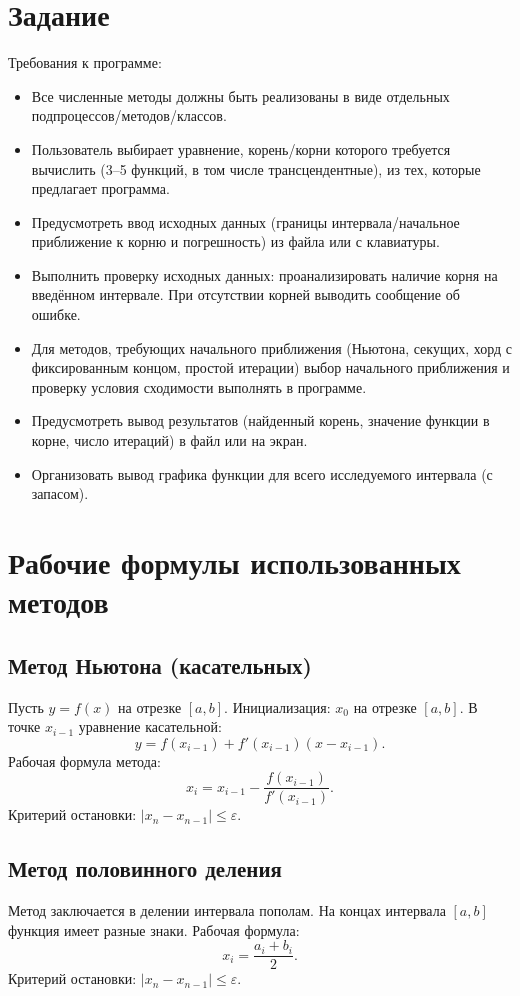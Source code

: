\documentclass[a4paper,12pt]{article}
\begin{document}
\section{Задание}
Требования к программе:
\begin{itemize}Цель
  \item Все численные методы должны быть реализованы в виде отдельных подпроцессов/методов/классов.
  \item Пользователь выбирает уравнение, корень/корни которого требуется вычислить (3–5 функций, в том числе трансцендентные), из тех, которые предлагает программа.
  \item Предусмотреть ввод исходных данных (границы интервала/начальное приближение к корню и погрешность) из файла или с клавиатуры.
  \item Выполнить проверку исходных данных: проанализировать наличие корня на введённом интервале. При отсутствии корней выводить сообщение об ошибке.
  \item Для методов, требующих начального приближения (Ньютона, секущих, хорд с фиксированным концом, простой итерации) выбор начального приближения и проверку условия сходимости выполнять в программе.
  \item Предусмотреть вывод результатов (найденный корень, значение функции в корне, число итераций) в файл или на экран.
  \item Организовать вывод графика функции для всего исследуемого интервала (с запасом).
\end{itemize}

\section{Рабочие формулы использованных методов}
\subsection{Метод Ньютона (касательных)}
Пусть $y=f(x)$ на отрезке $[a,b]$. Инициализация: $x_0$ на отрезке $[a,b]$. В точке $x_{i-1}$ уравнение касательной:
\[ y = f(x_{i-1}) + f'(x_{i-1})(x - x_{i-1}). \]
Рабочая формула метода:
\[ x_i = x_{i-1} - \frac{f(x_{i-1})}{f'(x_{i-1})}. \]
Критерий остановки: $|x_n - x_{n-1}| \le \varepsilon$.

\subsection{Метод половинного деления}
Метод заключается в делении интервала пополам. На концах интервала $[a,b]$ функция имеет разные знаки. Рабочая формула:
\[ x_i = \frac{a_i + b_i}{2}. \]
Критерий остановки: $|x_n - x_{n-1}| \le \varepsilon$.
\end{document}
